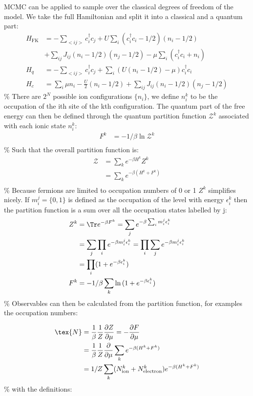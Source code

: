 MCMC can be applied to sample over the classical degrees of freedom of the model. We take the full Hamiltonian and split it into a classical and a quantum part: \[\begin{aligned}
    H_{\mathrm{FK}} &= -\sum_{<ij>} c^\dagger_{i}c_{j} + U \sum_{i} (c^\dagger_{i}c_{i} - 1/2)( n_i - 1/2) \\
    &+ \sum_{ij} J_{ij} (n_i - 1/2) (n_j - 1/2)  - \mu \sum_i (c^\dagger_{i}c_{i} + n_i)\\
    H_q &= -\sum_{<ij>} c^\dagger_{i}c_{j} + \sum_{i} \left(U(n_i - 1/2) - \mu\right) c^\dagger_{i}c_{i}\\
    H_c &= \sum_i \mu n_i - \frac{U}{2}(n_i - 1/2) + \sum_{ij}J_{ij}(n_i - 1/2)(n_j - 1/2)
\end{aligned}
\] \% There are \(2^N\) possible ion configurations \(\{ n_i \}\), we define \(n^k_i\) to be the occupation of the ith site of the kth configuration. The quantum part of the free energy can then be defined through the quantum partition function \(\mathcal{Z}^k\) associated with each ionic state \(n^k_i\): \[\begin{aligned}
F^k &= -1/\beta \ln{\mathcal{Z}^k} \\
\end{aligned}\] \% Such that the overall partition function is: \[\begin{aligned}
\mathcal{Z} &= \sum_k e^{- \beta H^k} Z^k \\
&= \sum_k e^{-\beta (H^k + F^k)} \\
\end{aligned}\] \% Because fermions are limited to occupation numbers of 0 or 1 \(Z^k\) simplifies nicely. If \(m^j_i = \{0,1\}\) is defined as the occupation of the level with energy \(\epsilon^k_i\) then the partition function is a sum over all the occupation states labelled by j: \[\begin{aligned}
Z^k    &= \Tr e^{-\beta F^k} = \sum_j e^{-\beta \sum_i m^j_i \epsilon^k_i}\\
       &= \sum_j \prod_i e^{- \beta m^j_i \epsilon^k_i}= \prod_i \sum_j e^{- \beta m^j_i \epsilon^k_i}\\
       &= \prod_i (1 + e^{- \beta \epsilon^k_i})\\
F^k    &= -1/\beta \sum_k \ln{(1 + e^{- \beta \epsilon^k_i})}
\end{aligned}\] \% Observables can then be calculated from the partition function, for examples the occupation numbers:

\[\begin{aligned}
\tex{N} &= \frac{1}{\beta} \frac{1}{Z} \frac{\partial Z}{\partial \mu} = - \frac{\partial F}{\partial \mu}\\
    &= \frac{1}{\beta} \frac{1}{Z} \frac{\partial}{\partial \mu} \sum_k e^{-\beta (H^k + F^k)}\\
    &= 1/Z \sum_k (N^k_{\mathrm{ion}} + N^k_{\mathrm{electron}}) e^{-\beta (H^k + F^k)}\\
\end{aligned}\] \% with the definitions:

